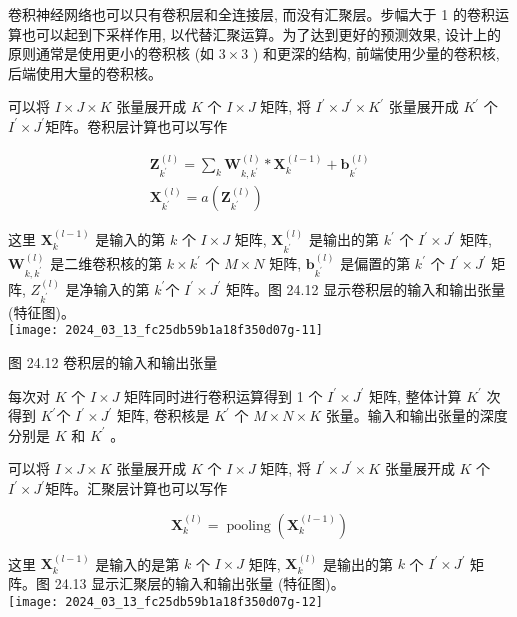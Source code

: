 \documentclass[10pt]{article}
\begin{document}
卷积神经网络也可以只有卷积层和全连接层, 而没有汇聚层。步幅大于 1 的卷积运算也可以起到下采样作用, 以代替汇聚运算。为了达到更好的预测效果, 设计上的原则通常是使用更小的卷积核 (如 $3 \times 3$ ) 和更深的结构, 前端使用少量的卷积核, 后端使用大量的卷积核。

可以将 $I \times J \times K$ 张量展开成 $K$ 个 $I \times J$ 矩阵, 将 $I^{\prime} \times J^{\prime} \times K^{\prime}$ 张量展开成 $K^{\prime}$ 个 $I^{\prime} \times J^{\prime}$矩阵。卷积层计算也可以写作


\begin{gather*}
\boldsymbol{Z}_{k^{\prime}}^{(l)}=\sum_{k} \boldsymbol{W}_{k, k^{\prime}}^{(l)} * \boldsymbol{X}_{k}^{(l-1)}+\boldsymbol{b}_{k^{\prime}}^{(l)}  \tag{24.15}\\
\boldsymbol{X}_{k^{\prime}}^{(l)}=a\left(\boldsymbol{Z}_{k^{\prime}}^{(l)}\right) \tag{24.16}
\end{gather*}


这里 $\boldsymbol{X}_{k}^{(l-1)}$ 是输入的第 $k$ 个 $I \times J$ 矩阵, $\boldsymbol{X}_{k^{\prime}}^{(l)}$ 是输出的第 $k^{\prime}$ 个 $I^{\prime} \times J^{\prime}$ 矩阵, $\boldsymbol{W}_{k, k^{\prime}}^{(l)}$ 是二维卷积核的第 $k \times k^{\prime}$ 个 $M \times N$ 矩阵, $\boldsymbol{b}_{k^{\prime}}^{(l)}$ 是偏置的第 $k^{\prime}$ 个 $I^{\prime} \times J^{\prime}$ 矩阵, $Z_{k^{\prime}}^{(l)}$ 是净输入的第 $k^{\prime}$个 $I^{\prime} \times J^{\prime}$ 矩阵。图 24.12 显示卷积层的输入和输出张量 (特征图)。\\
\texttt{[image: 2024\_03\_13\_fc25db59b1a18f350d07g-11]}

图 24.12 卷积层的输入和输出张量

每次对 $K$ 个 $I \times J$ 矩阵同时进行卷积运算得到 1 个 $I^{\prime} \times J^{\prime}$ 矩阵, 整体计算 $K^{\prime}$ 次得到 $K^{\prime}$个 $I^{\prime} \times J^{\prime}$ 矩阵, 卷积核是 $K^{\prime}$ 个 $M \times N \times K$ 张量。输入和输出张量的深度分别是 $K$ 和 $K^{\prime}$ 。

可以将 $I \times J \times K$ 张量展开成 $K$ 个 $I \times J$ 矩阵, 将 $I^{\prime} \times J^{\prime} \times K$ 张量展开成 $K$ 个 $I^{\prime} \times J^{\prime}$矩阵。汇聚层计算也可以写作


\begin{equation*}
\boldsymbol{X}_{k}^{(l)}=\operatorname{pooling}\left(\boldsymbol{X}_{k}^{(l-1)}\right) \tag{24.17}
\end{equation*}


这里 $\boldsymbol{X}_{k}^{(l-1)}$ 是输入的是第 $k$ 个 $I \times J$ 矩阵, $\boldsymbol{X}_{k}^{(l)}$ 是输出的第 $k$ 个 $I^{\prime} \times J^{\prime}$ 矩阵。图 24.13 显示汇聚层的输入和输出张量 (特征图)。\\
\texttt{[image: 2024\_03\_13\_fc25db59b1a18f350d07g-12]}
\end{document}
